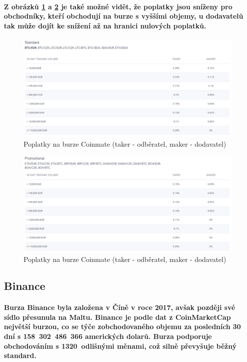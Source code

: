 \documentclass[thesis=B,czech]{FITthesis}[2019/03/21]
\begin{document}
\paragraph{
Z obrázků \ref{coinmate_standard} a \ref{coinmate_promotional} je také možné vidět, že poplatky jsou sníženy pro obchodníky, kteří obchodují na burze s vyššími objemy, u dodavatelů tak může dojít ke snížení až na hranici nulových poplatků. \cite{coinmate_fees}
}
\begin{figure}\centering
	\includegraphics[width=1\textwidth]{images/coinmate_standard.PNG}
	\caption{Poplatky na burze Coinmate (taker - odběratel, maker - dodavatel) \cite{coinmate_fees}}\label{coinmate_standard}
\end{figure}
\begin{figure}\centering
	\includegraphics[width=1\textwidth]{images/coinmate_promotional.PNG}
	\caption{Poplatky na burze Coinmate (taker - odběratel, maker - dodavatel) \cite{coinmate_fees}}\label{coinmate_promotional}
\end{figure}
\subsection{Binance}
\paragraph{
Burza Binance byla založena v Číně v roce 2017, avšak později své sídlo přesunula na Maltu. Binance je podle dat z CoinMarketCap největší burzou, co se týče zobchodovaného objemu za posledních 30 dní s 158~302~486~366 amerických dolarů. \cite{coinmarketcap} Burza podporuje obchodováním s 1320~odlišnými měnami, což silně převyšuje běžný standard.
}
\end{document}
